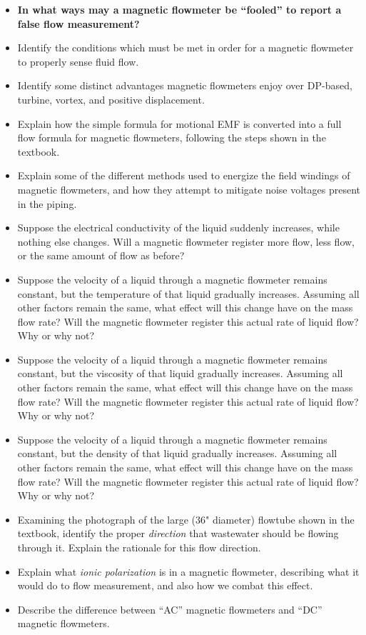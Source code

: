 \begin{itemize}
\item{} {\bf In what ways may a magnetic flowmeter be ``fooled'' to report a false flow measurement?}
\item{} Identify the conditions which must be met in order for a magnetic flowmeter to properly sense fluid flow.
\item{} Identify some distinct advantages magnetic flowmeters enjoy over DP-based, turbine, vortex, and positive displacement.
\item{} Explain how the simple formula for motional EMF is converted into a full flow formula for magnetic flowmeters, following the steps shown in the textbook.
\item{} Explain some of the different methods used to energize the field windings of magnetic flowmeters, and how they attempt to mitigate noise voltages present in the piping.
\item{} Suppose the electrical conductivity of the liquid suddenly increases, while nothing else changes.  Will a magnetic flowmeter register more flow, less flow, or the same amount of flow as before?
\item{} Suppose the velocity of a liquid through a magnetic flowmeter remains constant, but the temperature of that liquid gradually increases.  Assuming all other factors remain the same, what effect will this change have on the mass flow rate?  Will the magnetic flowmeter register this actual rate of liquid flow?  Why or why not?
\item{} Suppose the velocity of a liquid through a magnetic flowmeter remains constant, but the viscosity of that liquid gradually increases.  Assuming all other factors remain the same, what effect will this change have on the mass flow rate?  Will the magnetic flowmeter register this actual rate of liquid flow?  Why or why not?
\item{} Suppose the velocity of a liquid through a magnetic flowmeter remains constant, but the density of that liquid gradually increases.  Assuming all other factors remain the same, what effect will this change have on the mass flow rate?  Will the magnetic flowmeter register this actual rate of liquid flow?  Why or why not?
\item{} Examining the photograph of the large (36" diameter) flowtube shown in the textbook, identify the proper {\it direction} that wastewater should be flowing through it.  Explain the rationale for this flow direction.
\item{} Explain what {\it ionic polarization} is in a magnetic flowmeter, describing what it would do to flow measurement, and also how we combat this effect.
\item{} Describe the difference between ``AC'' magnetic flowmeters and ``DC'' magnetic flowmeters.
\end{itemize}








